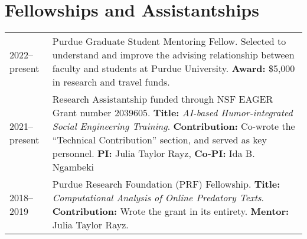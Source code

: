 \documentclass[11pt]{article}
\begin{document}
\section*{Fellowships and Assistantships}
\vspace{-.5em}
\renewcommand*{\arraystretch}{1.5}
\begin{tabularx}{\textwidth}{@{}p{} X}
2022--present & Purdue Graduate Student Mentoring Fellow. Selected to understand and improve the advising relationship between faculty and students at Purdue University. \textbf{Award:} \$5{,}000 in research and travel funds.\\
2021--present & Research Assistantship funded through NSF EAGER Grant number 2039605. \textbf{Title:} \emph{AI-based Humor-integrated Social Engineering Training}. \textbf{Contribution:} Co-wrote the ``Technical Contribution'' section, and served as key personnel. \textbf{PI:} Julia Taylor Rayz, \textbf{Co-PI:} Ida B. Ngambeki \\
2018--2019 & Purdue Research Foundation (PRF) Fellowship. \textbf{Title:} \textit{Computational Analysis of Online Predatory Texts}. \textbf{Contribution:} Wrote the grant in its entirety. \textbf{Mentor:} Julia Taylor Rayz.\\
\end{tabularx}
\end{document}
